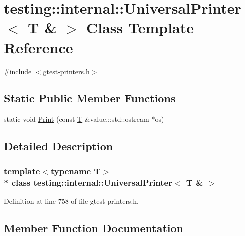 \hypertarget{classtesting_1_1internal_1_1_universal_printer_3_01_t_01_6_01_4}{}\section{testing\+:\+:internal\+:\+:Universal\+Printer$<$ T \& $>$ Class Template Reference}
\label{classtesting_1_1internal_1_1_universal_printer_3_01_t_01_6_01_4}


{\ttfamily \#include $<$gtest-\/printers.\+h$>$}

\subsection*{Static Public Member Functions}
\begin{DoxyCompactItemize}
\item 
static void \hyperlink{classtesting_1_1internal_1_1_universal_printer_3_01_t_01_6_01_4_a2a63ddb20294c4234b7e8f3c7a56355d}{Print} (const \hyperlink{functions__7_8js_adf1f3edb9115acb0a1e04209b7a9937b}{T} \&value,\+::std\+::ostream $\ast$os)
\end{DoxyCompactItemize}


\subsection{Detailed Description}
\subsubsection*{template$<$typename T$>$\\*
class testing\+::internal\+::\+Universal\+Printer$<$ T \& $>$}



Definition at line 758 of file gtest-\/printers.\+h.



\subsection{Member Function Documentation}
